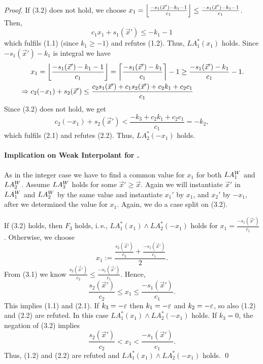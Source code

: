 \begin{techreport}
\begin{proof}
If (3.2) does not hold,
we choose $x_1 = \left\lfloor \frac{-s_1(\vec x')-k_1-1}{c_1} \right\rfloor
\leq \frac{-s_1(\vec x')-k_1-1}{c_1}$.  Then,
\[ c_1 x_1 + s_1(\vec x') \leq -k_1 -1\]
which fulfils (1.1) (since $k_1 \geq -1$) and refutes (1.2).  
Thus, $LA^*_1(x_1)$ holds.  
Since $-s_1(\vec x')-k_1$ is integral we have
\begin{align*}
  &x_1 = \left\lfloor \frac{-s_1(\vec x')-k_1-1}{c_1} \right\rfloor = 
         \left\lceil \frac{-s_1(\vec x')-k_1}{c_1} \right\rceil-1 
       \geq \frac{-s_1(\vec x')-k_1}{c_1} - 1.\\
{}\Rightarrow{} &c_2 (-x_1) + s_2(\vec x') \leq 
  \frac{c_2s_1(\vec x') + c_1s_2(\vec x') +c_2k_1 + c_2 c_1}{c_1}
\end{align*}
Since (3.2) does not hold, we get
\[ c_2 (-x_1) + s_2(\vec x')
   < \frac {-k_3 + c_2 k_1 + c_2c_1 }{c_1} = -k_2, \]
which fulfils (2.1) and refutes (2.2).  Thus, $LA^*_2(-x_1)$ holds.  

\paragraph*{Implication on Weak Interpolant for \laq.}

As in the integer case we have to find a common value for $x_1$ for both
$LA^W_1$ and $LA^W_2$.  Assume $LA^W_3$ holds for some $\vec x' \geq \vec x$.
Again we will instantiate $\vec x'$ in $LA^W_1$ and $LA^W_2$ by the same value and
instantiate $x_1'$ by $x_1$, and $x_2'$ by $-x_1$, after we determined the
value for $x_1$.  Again, we do a case split on (3.2).

If (3.2) holds, then $F_3$ holds, i.\,e., $LA^*_1(x_1) \wedge LA^*_2(-x_1)$ holds for $x_1 =\frac{-s_1(\vec x')}{c_1}$.
%
Otherwise, we choose 
\[x_1:=\dfrac{\frac{s_2(\vec x')}{c_2}+\frac{-s_1(\vec x')}{c_1}}{2}.\]
From (3.1) we know $\frac{s_2(\vec x')}{c_2}\leq\frac{-s_1(\vec x')}{c_1}$. Hence,
\[\frac{s_2(\vec x')}{c_2} \leq x_1 \leq \frac{-s_1(\vec x')}{c_1}.\]
This implies (1.1) and (2.1).  If $k_3 = -\varepsilon$ then $k_1=-\varepsilon$ and
$k_2=-\varepsilon$, so also (1.2) and (2.2) are refuted.  In this case
$LA^*_1(x_1) \wedge LA^*_2(-x_1)$ holds.
If $k_3 = 0$, the negation of (3.2) implies
\[\frac{s_2(\vec x')}{c_2}< x_1 < \frac{-s_1(\vec x')}{c_1}.\]
Thus, (1.2) and (2.2) are refuted and $LA^*_1(x_1) \wedge LA^*_2(-x_1)$ holds.
\qed

\end{proof}
\fi

\end{techreport}

